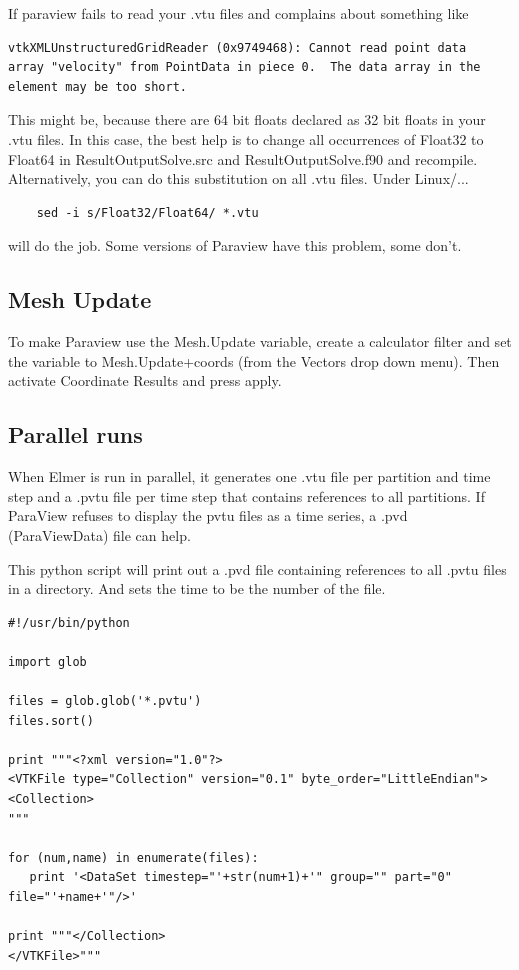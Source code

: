 If paraview fails to read your .vtu files and complains about something like

\begin{verbatim}
vtkXMLUnstructuredGridReader (0x9749468): Cannot read point data 
array "velocity" from PointData in piece 0.  The data array in the
element may be too short.
\end{verbatim}

This might be, because there are 64 bit floats declared as 32 bit floats in your .vtu files. In this case, the best help is to change all occurrences of Float32 to Float64 in ResultOutputSolve.src and ResultOutputSolve.f90 and recompile. Alternatively, you can do this substitution on all .vtu files. Under Linux/...

\begin{verbatim}
    sed -i s/Float32/Float64/ *.vtu
\end{verbatim}

\noindent will do the job. Some versions of Paraview have this problem, some don't.

\subsection{Mesh Update}

To make Paraview use the Mesh.Update variable, create a calculator filter and set the variable to Mesh.Update+coords (from the Vectors drop down menu). Then activate Coordinate Results and press apply. 

\subsection{Parallel runs}

When Elmer is run in parallel, it generates one .vtu file per partition and time step and a .pvtu file per time step that contains references to all partitions. If ParaView refuses to display the pvtu files as a time series, a .pvd (ParaViewData) file can help.

This python script will print out a .pvd file containing references to all .pvtu files in a directory. And sets the time to be the number of the file.

\begin{verbatim}
#!/usr/bin/python

import glob

files = glob.glob('*.pvtu')
files.sort()

print """<?xml version="1.0"?>
<VTKFile type="Collection" version="0.1" byte_order="LittleEndian">
<Collection>
"""

for (num,name) in enumerate(files):
   print '<DataSet timestep="'+str(num+1)+'" group="" part="0" file="'+name+'"/>'

print """</Collection>
</VTKFile>"""
\end{verbatim}

